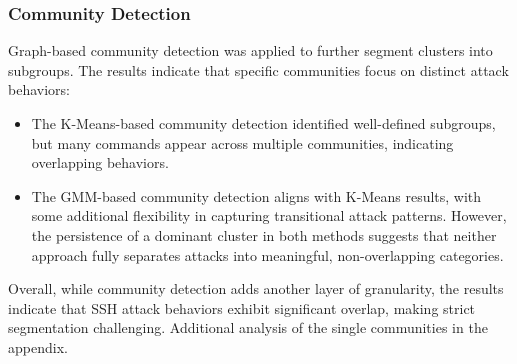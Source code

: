             \subsubsection{Community Detection \\}
            
                Graph-based community detection was applied to further segment clusters into subgroups. The results indicate that specific communities focus on distinct attack behaviors:

                \begin{itemize}
                    \item The K-Means-based community detection identified well-defined subgroups, but many commands appear across multiple communities, indicating overlapping behaviors.
                    \item The GMM-based community detection aligns with K-Means results, with some additional flexibility in capturing transitional attack patterns. However, the persistence of a dominant cluster in both methods suggests that neither approach fully separates attacks into meaningful, non-overlapping categories.
                \end{itemize}
                
                Overall, while community detection adds another layer of granularity, the results indicate that SSH attack behaviors exhibit significant overlap, making strict segmentation challenging. Additional analysis of the single communities in the appendix. 
                
